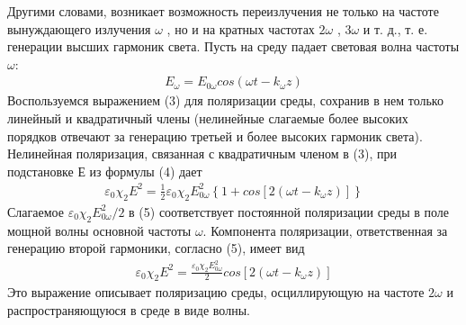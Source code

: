 \documentclass[twocolumn]{article}
\begin{document}
Другими словами, возникает возможность переизлучения не только на
частоте вынуждающего излучения $\omega$ , но и на кратных частотах $2 \omega$ ,
$3 \omega$ и т. д., т. е. генерации высших гармоник света. Пусть на среду падает световая волна частоты $\omega$:\begin{align}
E_{\omega} = E_{0\omega}cos(\omega t - k_\omega z)
\end{align}Воспользуемся выражением (3) для поляризации среды, сохранив в нем
только линейный и квадратичный члены (нелинейные слагаемые более высоких
порядков отвечают за генерацию третьей и более высоких гармоник света).
Нелинейная поляризация, связанная с квадратичным членом в (3), при
подстановке $Е$ из формулы (4) дает\begin{align}
\varepsilon_0\chi_2E^2 = \frac{1}{2}\varepsilon_0 \chi_2 E^2_{0\omega}\left\{1+cos\left[2\left(\omega t - k_\omega z\right)\right]\right\}
\end{align}Слагаемое $\varepsilon_0\chi_2 E^2_{0 \omega}/2$ в (5) соответствует постоянной
поляризации среды в поле мощной волны основной частоты $\omega$. Компонента
поляризации, ответственная за генерацию второй гармоники, согласно
(5), имеет вид\begin{align}
\varepsilon_0\chi_2E^2 = \frac{\varepsilon_0 \chi_2 E^2_{0\omega}}{2}cos\left[2\left(\omega t - k_\omega z\right)\right]
\end{align}Это выражение описывает поляризацию среды, осциллирующую на частоте
$2 \omega$ и распространяющуюся в среде в виде волны.
\end{document}
